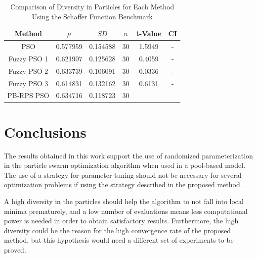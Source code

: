 \begin{table}[!t]
  \renewcommand{\arraystretch}{1.3}
  \caption{Comparison of Diversity in Particles for Each Method Using the Schaffer Function Benchmark}
  \label{diversity-schaffer}
  \centering
  \begin{tabular}{|c|c|c|c|c|c|}
    \hline
    Method & $\mu$ & $SD$ & $n$ & t-Value & CI \\
    \hline
    PSO 		& 0.577959 & 0.154588 & 30 & 1.5949 & - \\
    \hline
    Fuzzy PSO 1 & 0.621907 & 0.125628 & 30 & 0.4059 & - \\
    \hline
    Fuzzy PSO 2 & 0.633739 & 0.106091 & 30 & 0.0336 & - \\
    \hline
    Fuzzy PSO 3 & 0.614831 & 0.132162 & 30 & 0.6131 & - \\
    \hline
    PB-RPS PSO  & 0.634716 & 0.118723 & 30 &  &  \\
    \hline
  \end{tabular}
\end{table}


\section{Conclusions}
\label{conclusions}

The results obtained in this work support the use of randomized parameterization in the particle swarm optimization algorithm when used in a pool-based model. The use of a strategy for parameter tuning should not be necessary for several optimization problems if using the strategy described in the proposed method.

A high diversity in the particles should help the algorithm to not fall into local minima prematurely, and a low number of evaluations means less computational power is needed in order to obtain satisfactory results. Furthermore, the high diversity could be the reason for the high convergence rate of the proposed method, but this hypothesis would need a different set of experiments to be proved.
